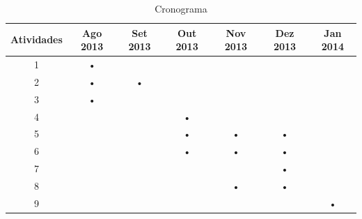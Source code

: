 \begin{table}[h]
	\centering
	\label{cronograma}
	
	\begin{tabular}{|c|c|c|c|c|c|c|}
		\hline
		\textbf{Atividades}	& \textbf{Ago 2013}	& \textbf{Set 2013}
		& \textbf{Out 2013}	& \textbf{Nov 2013}	& \textbf{Dez 2013}
		& \textbf{Jan 2014}	\\
		\hline\hline
		
		\hline
		1	& • 	&	&	&	&	&	\\
		\hline

		\hline
		2	& •	& •	&	&	&	&	\\
		\hline

		\hline
		3	& •	&	&	&	&	&	\\
		\hline

		\hline
		4	&	&	& •	&	&	&	\\
		\hline

		\hline
		5	& 	&	& •	& •	& •	&	\\
		\hline

		\hline
		6	& 	&	& •	& •	& •	&	\\
		\hline

		\hline
		7	& 	&	& 	& 	& •	&	\\
		\hline

		\hline
		8	& 	&	& 	& • 	& •	&	\\
		\hline

		\hline
		9	& 	&	& 	& 	& 	& •	\\
		\hline
	\end{tabular}

	\caption{Cronograma}
\end{table}
